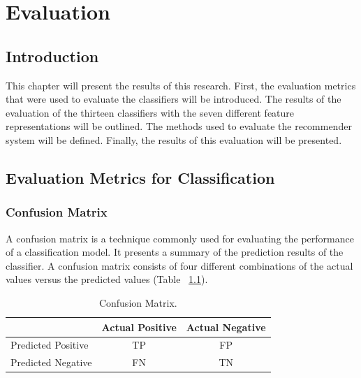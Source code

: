 \chapter{Evaluation}

\section{Introduction}
This chapter will present the results of this research. First, the evaluation metrics that were used to evaluate the classifiers will be introduced. The results of the evaluation of the thirteen classifiers with the seven different feature representations will be outlined. The methods used to evaluate the recommender system will be defined. Finally, the results of this evaluation will be presented. 

\section{Evaluation Metrics for Classification}

\subsection{Confusion Matrix}
A confusion matrix is a technique commonly used for evaluating the performance of a classification model. It presents a summary of the prediction results of the classifier. A confusion matrix consists of four different combinations of the actual values versus the predicted values (Table ~\ref{Table:confusionmatrix}). 

\begin{table}[h!]
\setlength\extrarowheight{5pt}
\caption{Confusion Matrix.}
\label{Table:confusionmatrix}
\begin{tabular}{c|c|c|}
\cline{2-3}
 & \multicolumn{1}{l|}{Actual Positive} & \multicolumn{1}{l|}{Actual Negative} \\ \hline
\multicolumn{1}{|l|}{Predicted Positive} & TP & FP \\ \hline
\multicolumn{1}{|l|}{Predicted Negative} & FN & TN \\ \hline
\end{tabular}
\end{table}

